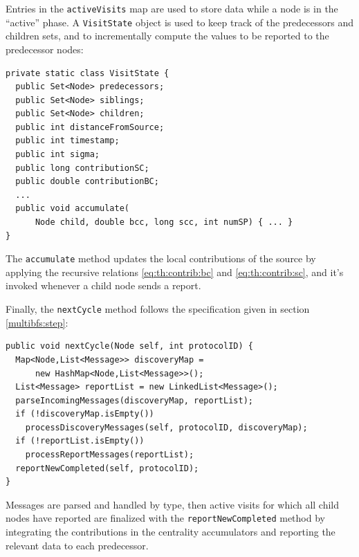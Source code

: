 Entries in the \texttt{activeVisits} map are used to store data while a node is in the ``active'' phase. A \texttt{VisitState} object is used to keep track of the predecessors and children sets, and to incrementally compute the values to be reported to the predecessor nodes:
\begin{verbatim}
private static class VisitState {
  public Set<Node> predecessors;
  public Set<Node> siblings;
  public Set<Node> children;
  public int distanceFromSource;
  public int timestamp;
  public int sigma;
  public long contributionSC;
  public double contributionBC;
  ...	
  public void accumulate(
      Node child, double bcc, long scc, int numSP) { ... }
}
\end{verbatim}
The \texttt{accumulate} method updates the local contributions of the source by applying the recursive relations \eqref{eq:th:contrib:bc} and \eqref{eq:th:contrib:sc}, and it's invoked whenever a child node sends a report.

Finally, the \texttt{nextCycle} method follows the specification given in section \ref{multibfs:step}:
\begin{verbatim}
public void nextCycle(Node self, int protocolID) {
  Map<Node,List<Message>> discoveryMap =
      new HashMap<Node,List<Message>>();
  List<Message> reportList = new LinkedList<Message>();
  parseIncomingMessages(discoveryMap, reportList);
  if (!discoveryMap.isEmpty())
    processDiscoveryMessages(self, protocolID, discoveryMap);
  if (!reportList.isEmpty())
    processReportMessages(reportList);
  reportNewCompleted(self, protocolID);
}
\end{verbatim}
Messages are parsed and handled by type, then active visits for which all child nodes have reported are finalized with the \texttt{reportNewCompleted} method by integrating the contributions in the centrality accumulators and reporting the relevant data to each predecessor.